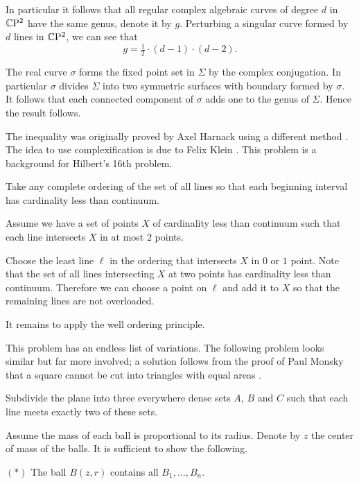 In particular it follows that all regular complex algebraic curves of degree $d$ in $\mathbb{C}\mathrm{P}^2$ have the same genus,
denote it by $g$.
Perturbing a singular curve formed by $d$ lines in $\mathbb{C}\mathrm{P}^2$,
we can see that 
\[g=\tfrac12\cdot(d-1)\cdot(d-2).\]

The real curve $\sigma$ forms the fixed point set in $\Sigma$ 
by the complex conjugation. 
In particular $\sigma$ divides $\Sigma$ into two symmetric surfaces with boundary formed by $\sigma$.
It follows that each connected component of $\sigma$ adds one to the genus of $\Sigma$.
Hence the result follows.
\qeds
 
The inequality was originally proved 
by Axel Harnack using a different method \cite{harnack}.
The idea to use complexification is due to Felix Klein \cite{klein}.
This problem is a background for Hilbert's 16th problem. 

Take any complete ordering of the set of all lines 
so that each beginning interval has cardinality less than continuum.

Assume we have a set of points $X$ of cardinality less than continuum such that each line intersects $X$ in at most $2$ points.

Choose the least line $\ell$ in the ordering that intersects $X$ 
in $0$ or $1$ point.
Note that the set of all lines intersecting $X$ at two points has cardinality less than continuum.
Therefore we can choose a point on $\ell$ and add it to $X$ so that the remaining lines are not overloaded.

It remains to apply the well ordering principle.
\qeds

This problem has an endless list of variations.
The following problem looks similar but far more involved;
a solution follows from the proof of Paul Monsky that a square cannot be cut into triangles with equal areas \cite{monsky}.

\begin{pr}
Subdivide the plane into three everywhere dense sets $A$, $B$ and $C$ such that each line meets exactly two of these sets.
\end{pr}


Assume the mass of each ball is proportional to its radius.
Denote by $z$  the center of mass of the balls.
It is sufficient to show the following.
\begin{cl}{$({*})$}
The ball $B(z,r)$ contains all $B_1,\dots,B_n$.
\end{cl}

